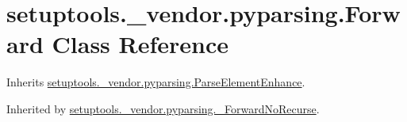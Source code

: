 \hypertarget{classsetuptools_1_1__vendor_1_1pyparsing_1_1_forward}{}\section{setuptools.\+\_\+vendor.\+pyparsing.\+Forward Class Reference}
\label{classsetuptools_1_1__vendor_1_1pyparsing_1_1_forward}


Inherits \hyperlink{classsetuptools_1_1__vendor_1_1pyparsing_1_1_parse_element_enhance}{setuptools.\+\_\+vendor.\+pyparsing.\+Parse\+Element\+Enhance}.



Inherited by \hyperlink{classsetuptools_1_1__vendor_1_1pyparsing_1_1___forward_no_recurse}{setuptools.\+\_\+vendor.\+pyparsing.\+\_\+\+Forward\+No\+Recurse}.

